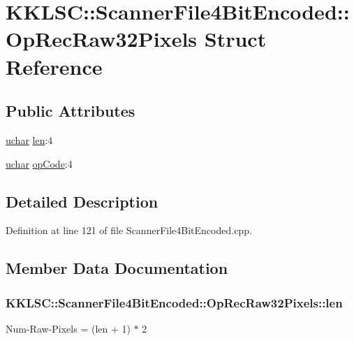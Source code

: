 \hypertarget{struct_scanner_file4_bit_encoded_1_1_op_rec_raw32_pixels}{}\section{K\+K\+L\+SC\+:\+:Scanner\+File4\+Bit\+Encoded\+:\+:Op\+Rec\+Raw32\+Pixels Struct Reference}
\label{struct_scanner_file4_bit_encoded_1_1_op_rec_raw32_pixels}
\subsection*{Public Attributes}
\begin{DoxyCompactItemize}
\item 
\hyperlink{namespace_k_k_b_ace9969169bf514f9ee6185186949cdf7}{uchar} \hyperlink{struct_scanner_file4_bit_encoded_1_1_op_rec_raw32_pixels_a80e34603721c216e53d28d0bb026b88c}{len}\+:4
\item 
\hyperlink{namespace_k_k_b_ace9969169bf514f9ee6185186949cdf7}{uchar} \hyperlink{struct_scanner_file4_bit_encoded_1_1_op_rec_raw32_pixels_a8b859461261a9f277cf53f3f29f6bfdf}{op\+Code}\+:4
\end{DoxyCompactItemize}


\subsection{Detailed Description}


Definition at line 121 of file Scanner\+File4\+Bit\+Encoded.\+cpp.



\subsection{Member Data Documentation}
\subsubsection[{\texorpdfstring{len}{len}}]{ K\+K\+L\+S\+C\+::\+Scanner\+File4\+Bit\+Encoded\+::\+Op\+Rec\+Raw32\+Pixels\+::len}\hypertarget{struct_scanner_file4_bit_encoded_1_1_op_rec_raw32_pixels_a80e34603721c216e53d28d0bb026b88c}{}\label{struct_scanner_file4_bit_encoded_1_1_op_rec_raw32_pixels_a80e34603721c216e53d28d0bb026b88c}
Num-\/\+Raw-\/\+Pixels = (len + 1) $\ast$ 2 

